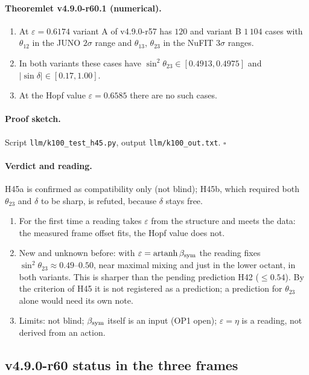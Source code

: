 \paragraph{Theoremlet v4.9.0-r60.1 (numerical).}
\begin{enumerate}[leftmargin=2em]
\item[(a)] At \(\varepsilon=0.6174\) variant A of v4.9.0-r57 has \(120\) and variant B \(1\,104\) cases with \(\theta_{12}\) in the JUNO \(2\sigma\) range and \(\theta_{13}\),
\(\theta_{23}\) in the NuFIT \(3\sigma\) ranges.
\item[(b)] In both variants these cases have \(\sin^2\theta_{23}\in[0.4913,0.4975]\) and \(|\sin\delta|\in[0.17,1.00]\).
\item[(c)] At the Hopf value \(\varepsilon=0.6585\) there are no such cases.
\end{enumerate}

\paragraph{Proof sketch.}
Script \texttt{llm/k100\_test\_h45.py}, output \texttt{llm/k100\_out.txt}.  \(\square\)

\paragraph{Verdict and reading.}
H45a is confirmed as compatibility only (not blind); H45b, which required both \(\theta_{23}\) and \(\delta\) to be sharp, is refuted, because \(\delta\) stays free.
\begin{enumerate}[leftmargin=2em]
\item For the first time a reading takes \(\varepsilon\) from the structure and meets the data: the measured frame offset fits, the Hopf value does not.
\item New and unknown before: with \(\varepsilon=\operatorname{artanh}\beta_{\rm sym}\) the reading fixes \(\sin^2\theta_{23}\approx0.49\)--\(0.50\), near maximal mixing and just in the
lower octant, in both variants.  This is sharper than the pending prediction H42 (\(\le0.54\)).  By the criterion of H45 it is not registered as a prediction; a
prediction for \(\theta_{23}\) alone would need its own note.
\item Limits: not blind; \(\beta_{\rm sym}\) itself is an input (OP1 open); \(\varepsilon=\eta\) is a reading, not derived from an action.
\end{enumerate}

\subsection*{v4.9.0-r60 status in the three frames}
\label{subsec:v490-r60-frames}

